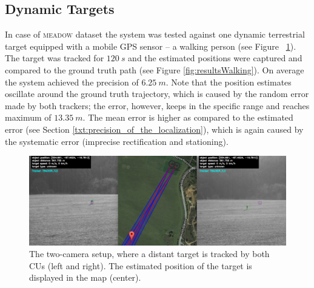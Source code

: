 \subsection{Dynamic Targets}

In case of \textsc{meadow} dataset the system was tested against one dynamic terrestrial target equipped with a mobile GPS sensor -- a walking person (see Figure~ \ref{fig:trackingAndMap}). The target was tracked for $120~s$ and the estimated positions were captured and compared to the ground truth path (see Figure \ref{fig:resultsWalking}). On average the system achieved the precision of $6.25~m$. Note that the position estimates oscillate around the ground truth trajectory, which is caused by the random error made by both trackers; the error, however, keeps in the specific range and reaches maximum of $13.35~m$. The mean error is higher as compared to the estimated error (see Section \ref{txt:precision_of_the_localization}), which is again caused by the systematic error (imprecise rectification and stationing).

\begin{figure}[!h]\centering
	\centering
	\includegraphics[width=0.98\linewidth]{fig/tracking_and_map.png}
	\caption{The two-camera setup, where a distant target is tracked by both CUs (left and right). The estimated position of the target is displayed in the map (center).}
	\label{fig:trackingAndMap}
\end{figure}

